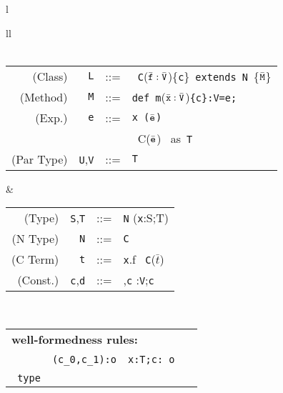 
\begin{figure*}
\footnotesize
\begin{tabular}{l}
\begin{tabular}{ll}
 \\
\quad\\
\begin{tabular}{r@{\quad}rcl}
  (Class) & {\tt L} &{::=}& \klass\ {\tt C}($\bar{\tt f}:\bar{\tt V}$)\{{\tt c}\}\ {\tt extends}\ {\tt N}\ \{$\bar{\tt M}$\} \\
  (Method)& {\tt M} &{::=}& {\tt def}\ {\tt m}($\bar{\tt x}:\bar{\tt V}$){\tt \{c\}:V=e;}\\
  (Exp.)& {\tt e} &{::=}& \tt {\tt x} \alt \this \alt {\tt e.f} \alt {\tt e.m}($\bar{\tt e}$) \\
  &&& \alt \new\ C($\bar{\tt e}$) \alt {\tt e}\ \mbox{as {\tt T}} \\ 
  (Par Type) & {\tt U},{\tt V}&{::=} & {\tt T} \\
\end{tabular} 
&
\begin{tabular}{r@{\quad}rcl}
  (Type)& {\tt S},{\tt T}&{::=}& {\tt N} \alt {\tt T\{c\}} \alt ({\tt x}:S;T)\\
  (N Type) & {\tt N}&{::=}& {\tt C} \alt {\tt N\{c\}}\\
  (C Term) & {\tt t} &{::=}& {\tt x}\alt \self \alt \this \alt {\tt t}.f \alt \new\ {\tt C}($\bar{t}$)\\
  (Const.) & {\tt c},{\tt d} &{::=}&\true \alt {\tt t==t} \alt {\tt c},{\tt c} \alt {\tt x}:{\tt V};{\tt c}\\
\end{tabular} 
\end{tabular}
\quad \\
{\tabcolsep=0pt
\begin{tabular}{p{}p{}p{}p{}}
\multicolumn{4}{l}{\bf \FX{} well-formedness rules:}\\
\infax[{\tt true}]{\Gamma \vdash {\tt true}: {\tt o}}
&
\infrule[And]
	{\tt \Gamma \vdash c_0: o \andalso \Gamma \vdash c_1: o}
	{\tt \Gamma \vdash (c_0,c_1):o}
&
\infrule[Exists]
	{\tt \Gamma \vdash t: T \andalso \Gamma \vdash c[t/x]:o}
	{\tt \Gamma \vdash x:T;c: o}
&
\infrule[Class]
	{\Gamma \vdash \klass({\tt C})}
	{\Gamma \vdash {\tt C}\ \type} 
\\
\infrule[Exist-T]
	{\tt \Gamma \vdash {\tt S}\ \type, {\tt T}\ \type}
	{\tt \Gamma \vdash {\tt x:S;T}\ {\tt type}} 

\end{tabular}}
\end{tabular}
\end{figure*}
